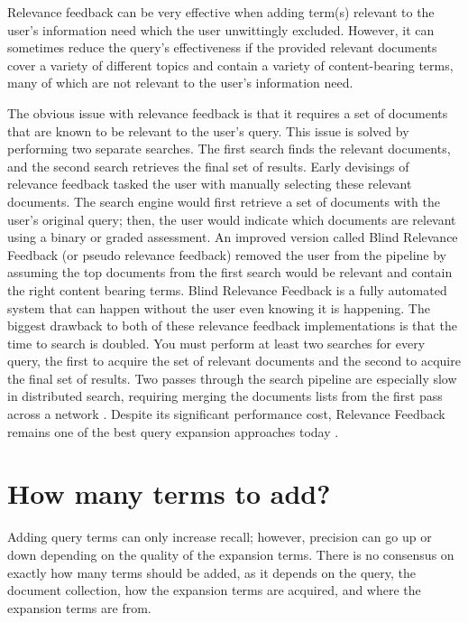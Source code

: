 Relevance feedback can be very effective when adding term(s) relevant to the user's information need which the user unwittingly excluded. However, it can sometimes reduce the query's effectiveness if the provided relevant documents cover a variety of different topics and contain a variety of content-bearing terms, many of which are not relevant to the user's information need.

The obvious issue with relevance feedback is that it requires a set of documents that are known to be relevant to the user's query. This issue is solved by performing two separate searches. The first search finds the relevant documents, and the second search retrieves the final set of results. Early devisings of relevance feedback tasked the user with manually selecting these relevant documents. The search engine would first retrieve a set of documents with the user's original query; then, the user would indicate which documents are relevant using a binary or graded assessment. An improved version called Blind Relevance Feedback (or pseudo relevance feedback) removed the user from the pipeline by assuming the top documents from the first search would be relevant and contain the right content bearing terms. Blind Relevance Feedback is a fully automated system that can happen without the user even knowing it is happening. The biggest drawback to both of these relevance feedback implementations is that the time to search is doubled. You must perform at least two searches for every query, the first to acquire the set of relevant documents and the second to acquire the final set of results. Two passes through the search pipeline are especially slow in distributed search, requiring merging the documents lists from the first pass across a network \cite{martinezsantiago}. Despite its significant performance cost, Relevance Feedback remains one of the best query expansion approaches today \cite{Carpineto:2012:SAQ:2071389.2071390}.





\section{How many terms to add?}
Adding query terms can only increase recall; however, precision can go up or down depending on the quality of the expansion terms. There is no consensus on exactly how many terms should be added, as it depends on the query, the document collection, how the expansion terms are acquired, and where the expansion terms are from.

